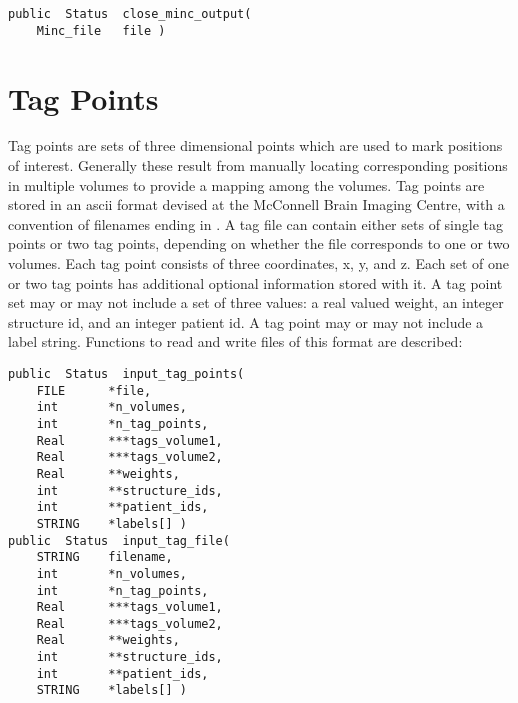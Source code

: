 {\bf\begin{verbatim}
public  Status  close_minc_output(
    Minc_file   file )
\end{verbatim}}


\chapter{Tag Points}

Tag points are sets of three dimensional points which are used to mark
positions of interest.  Generally these result from manually locating
corresponding positions in multiple volumes to provide a mapping among
the volumes.  Tag points are stored in an ascii format devised at the
McConnell Brain Imaging Centre, with a convention of filenames ending in
.  A tag file can contain either sets of single tag points
or two tag points, depending on whether the file corresponds to one or
two volumes.  Each tag point consists of three coordinates, x, y, and
z.  Each set of one or two tag points has additional optional
information stored with it.  A tag point set may or may not include a
set of three values:  a real valued weight, an integer structure id,
and an integer patient id.  A tag point may or may not include a label
string.  Functions to read and write files of this
format are described:

{\bf\begin{verbatim}
public  Status  input_tag_points(
    FILE      *file,
    int       *n_volumes,
    int       *n_tag_points,
    Real      ***tags_volume1,
    Real      ***tags_volume2,
    Real      **weights,
    int       **structure_ids,
    int       **patient_ids,
    STRING    *labels[] )
public  Status  input_tag_file(
    STRING    filename,
    int       *n_volumes,
    int       *n_tag_points,
    Real      ***tags_volume1,
    Real      ***tags_volume2,
    Real      **weights,
    int       **structure_ids,
    int       **patient_ids,
    STRING    *labels[] )
\end{verbatim}}


